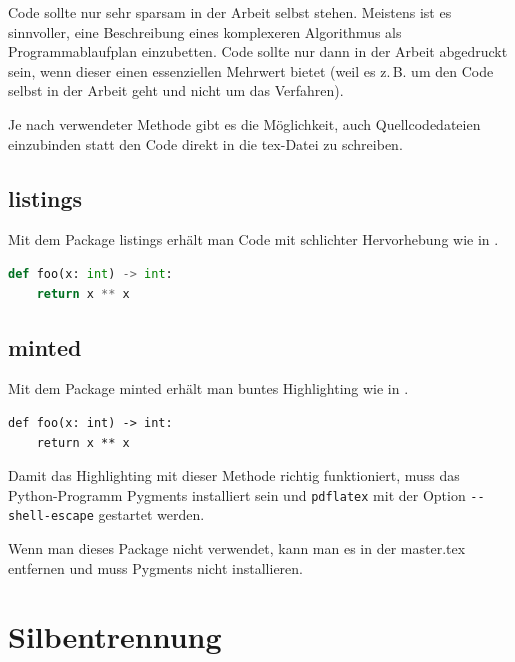 Code sollte nur sehr sparsam in der Arbeit selbst stehen.
Meistens ist es sinnvoller, eine Beschreibung eines komplexeren Algorithmus als Programmablaufplan einzubetten.
Code sollte nur dann in der Arbeit abgedruckt sein, wenn dieser einen essenziellen Mehrwert bietet (weil es z.\,B. um den Code selbst in der Arbeit geht und nicht um das Verfahren).

Je nach verwendeter Methode gibt es die Möglichkeit, auch Quellcodedateien einzubinden statt den Code direkt in die tex-Datei zu schreiben.

\subsection{listings}

Mit dem Package listings erhält man Code mit schlichter Hervorhebung wie in .

\begin{lstlisting}[language=Python, caption=Python-Beispiel, label={lst:lstlisting}]
def foo(x: int) -> int:
    return x ** x
\end{lstlisting}

\subsection{minted}

Mit dem Package minted erhält man buntes Highlighting wie in .

\begin{listing}
\begin{verbatim}
def foo(x: int) -> int:
    return x ** x
\end{verbatim}
\caption[Dasselbe Beispiel nochmal in bunt]{Dasselbe Beispiel nochmal in bunt (wenn man nur listings oder nur minted benutzt, dann ist die Nummerierung auch richtig)}
\label{lst:minted}
\end{listing}



Damit das Highlighting mit dieser Methode richtig funktioniert, muss das Python-Programm Pygments installiert sein und \texttt{pdflatex} mit der Option \texttt{-{}-shell-escape} gestartet werden.

Wenn man dieses Package nicht verwendet, kann man es in der master.tex entfernen und muss Pygments nicht installieren.

\section{Silbentrennung}

